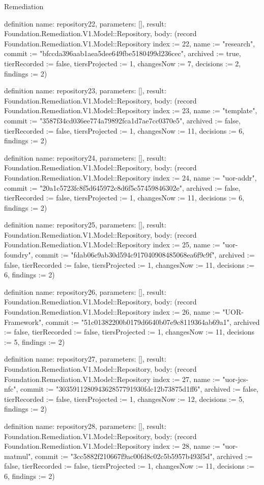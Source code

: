 \begin{lexlean}{Remediation}
\begin{semanticmodule}
definition{
  name: repository22,
  parameters: [],
  result: Foundation.Remediation.V1.Model::Repository,
  body: (record Foundation.Remediation.V1.Model::Repository {index := 22, name := "research", commit := "bfccda396aab1aea5dee649fbe5180499d236cec", archived := true, tierRecorded := false, tiersProjected := 1, changesNow := 7, decisions := 2, findings := 2})
}

definition{
  name: repository23,
  parameters: [],
  result: Foundation.Remediation.V1.Model::Repository,
  body: (record Foundation.Remediation.V1.Model::Repository {index := 23, name := "template", commit := "3587f34cd036ee774a79892fca1d7ae7cc0370e5", archived := false, tierRecorded := false, tiersProjected := 1, changesNow := 11, decisions := 6, findings := 2})
}

definition{
  name: repository24,
  parameters: [],
  result: Foundation.Remediation.V1.Model::Repository,
  body: (record Foundation.Remediation.V1.Model::Repository {index := 24, name := "uor-addr", commit := "20a1c5723fc8f5d645972c8d6f5c57459846302e", archived := false, tierRecorded := false, tiersProjected := 1, changesNow := 11, decisions := 6, findings := 2})
}

definition{
  name: repository25,
  parameters: [],
  result: Foundation.Remediation.V1.Model::Repository,
  body: (record Foundation.Remediation.V1.Model::Repository {index := 25, name := "uor-foundry", commit := "fdab06c9ab30d594c917040908485068ea6f9c9f", archived := false, tierRecorded := false, tiersProjected := 1, changesNow := 11, decisions := 6, findings := 2})
}

definition{
  name: repository26,
  parameters: [],
  result: Foundation.Remediation.V1.Model::Repository,
  body: (record Foundation.Remediation.V1.Model::Repository {index := 26, name := "UOR-Framework", commit := "51c01382200b0179d6640b07e9c8119364ab69a1", archived := false, tierRecorded := false, tiersProjected := 1, changesNow := 11, decisions := 5, findings := 2})
}

definition{
  name: repository27,
  parameters: [],
  result: Foundation.Remediation.V1.Model::Repository,
  body: (record Foundation.Remediation.V1.Model::Repository {index := 27, name := "uor-jcs-nfc", commit := "303591128094362857791930fdc12b73875d1ff6", archived := false, tierRecorded := false, tiersProjected := 1, changesNow := 12, decisions := 5, findings := 2})
}

definition{
  name: repository28,
  parameters: [],
  result: Foundation.Remediation.V1.Model::Repository,
  body: (record Foundation.Remediation.V1.Model::Repository {index := 28, name := "uor-matmul", commit := "3cc5882f210667f9ac00fd8c02c5b5957b493f5d", archived := false, tierRecorded := false, tiersProjected := 1, changesNow := 11, decisions := 6, findings := 2})
}


\end{semanticmodule}
\end{lexlean}
